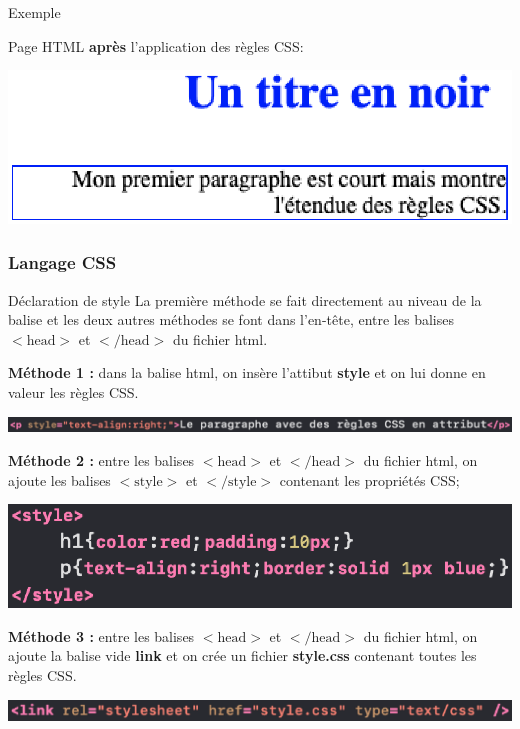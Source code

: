 \documentclass[8pt]{beamer}
\begin{document}
\begin{frame}
\begin{exampleblock}{Exemple}
\begin{minipage}{0.42\textwidth}
Page HTML \textbf{après} l'application des règles CSS:\medskip

\includegraphics[scale=0.4]{img/exempleCSS3.eps}
\end{minipage}

\end{exampleblock}

\end{frame}

\begin{frame}
\frametitle{Langage CSS}

\begin{block}{Déclaration de style}
La première méthode se fait directement au niveau de la balise et les deux autres méthodes se font dans l'en-tête, entre les balises $<\text{head}>$ et $</\text{head}>$ du fichier html.
\medskip

\textbf{Méthode 1 :} dans la balise html, on insère l'attibut \textbf{style} et on lui donne en valeur les règles CSS.
\begin{center}
\includegraphics[scale=0.38]{img/exemple3-CSS.eps}
\end{center}


\textbf{Méthode 2 :} entre les balises $<\text{head}>$ et $</\text{head}>$ du fichier html, on ajoute les balises $<\text{style}>$ et $</\text{style}>$ contenant les propriétés CSS;
\begin{center}
\includegraphics[scale=0.43]{img/exemple4-CSS.eps}
\end{center}

\textbf{Méthode 3 :} entre les balises $<\text{head}>$ et $</\text{head}>$ du fichier html, on ajoute la balise vide \textbf{link} et on crée un fichier \textbf{style.css} contenant toutes les règles CSS.
\begin{center}
\includegraphics[scale=0.45]{img/exemple5-CSS.eps}
\end{center}

\end{block}
\end{frame}
\end{document}
